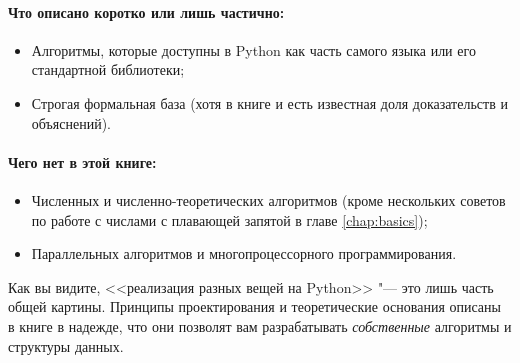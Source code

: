 \paragraph{Что описано коротко или лишь частично:}
\begin{itemize}
\item Алгоритмы, которые доступны в Python как часть самого языка или его стандартной библиотеки;
\item Строгая формальная база (хотя в книге и есть известная доля доказательств и объяснений).
\end{itemize}

\paragraph{Чего нет в этой книге:}
\begin{itemize}
\item Численных и численно-теоретических алгоритмов (кроме нескольких советов по работе с числами с плавающей запятой в главе \ref{chap:basics});
\item Параллельных алгоритмов и многопроцессорного программирования.
\end{itemize}

Как вы видите, <<реализация разных вещей на Python>> "--- это лишь часть общей картины. Принципы проектирования и теоретические основания описаны в книге в надежде, что они позволят вам разрабатывать \textit{собственные} алгоритмы и структуры данных.


